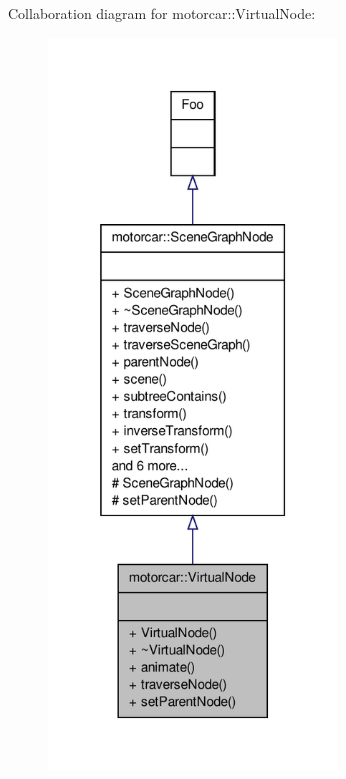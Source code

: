 Collaboration diagram for motorcar\-:\-:Virtual\-Node\-:
\nopagebreak
\begin{figure}[H]
\begin{center}
\leavevmode
\includegraphics[height=550pt]{classmotorcar_1_1VirtualNode__coll__graph}
\end{center}
\end{figure}
